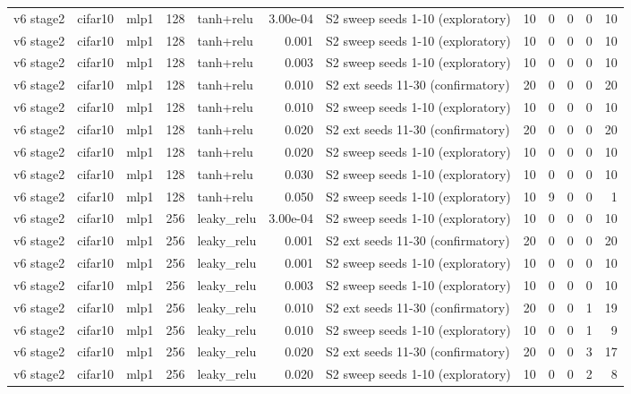 \begin{table}[htbp]
{\begin{tabular}{@{}lllrlrlrrrrr@{}}
v6 stage2 & cifar10 & mlp1 & 128 & tanh+relu & 3.00e-04 & S2 sweep seeds 1-10 (exploratory) & 10 & 0 & 0 & 0 & 10 \\
v6 stage2 & cifar10 & mlp1 & 128 & tanh+relu & 0.001 & S2 sweep seeds 1-10 (exploratory) & 10 & 0 & 0 & 0 & 10 \\
v6 stage2 & cifar10 & mlp1 & 128 & tanh+relu & 0.003 & S2 sweep seeds 1-10 (exploratory) & 10 & 0 & 0 & 0 & 10 \\
v6 stage2 & cifar10 & mlp1 & 128 & tanh+relu & 0.010 & S2 ext seeds 11-30 (confirmatory) & 20 & 0 & 0 & 0 & 20 \\
v6 stage2 & cifar10 & mlp1 & 128 & tanh+relu & 0.010 & S2 sweep seeds 1-10 (exploratory) & 10 & 0 & 0 & 0 & 10 \\
v6 stage2 & cifar10 & mlp1 & 128 & tanh+relu & 0.020 & S2 ext seeds 11-30 (confirmatory) & 20 & 0 & 0 & 0 & 20 \\
v6 stage2 & cifar10 & mlp1 & 128 & tanh+relu & 0.020 & S2 sweep seeds 1-10 (exploratory) & 10 & 0 & 0 & 0 & 10 \\
v6 stage2 & cifar10 & mlp1 & 128 & tanh+relu & 0.030 & S2 sweep seeds 1-10 (exploratory) & 10 & 0 & 0 & 0 & 10 \\
v6 stage2 & cifar10 & mlp1 & 128 & tanh+relu & 0.050 & S2 sweep seeds 1-10 (exploratory) & 10 & 9 & 0 & 0 & 1 \\
v6 stage2 & cifar10 & mlp1 & 256 & leaky\_relu & 3.00e-04 & S2 sweep seeds 1-10 (exploratory) & 10 & 0 & 0 & 0 & 10 \\
v6 stage2 & cifar10 & mlp1 & 256 & leaky\_relu & 0.001 & S2 ext seeds 11-30 (confirmatory) & 20 & 0 & 0 & 0 & 20 \\
v6 stage2 & cifar10 & mlp1 & 256 & leaky\_relu & 0.001 & S2 sweep seeds 1-10 (exploratory) & 10 & 0 & 0 & 0 & 10 \\
v6 stage2 & cifar10 & mlp1 & 256 & leaky\_relu & 0.003 & S2 sweep seeds 1-10 (exploratory) & 10 & 0 & 0 & 0 & 10 \\
v6 stage2 & cifar10 & mlp1 & 256 & leaky\_relu & 0.010 & S2 ext seeds 11-30 (confirmatory) & 20 & 0 & 0 & 1 & 19 \\
v6 stage2 & cifar10 & mlp1 & 256 & leaky\_relu & 0.010 & S2 sweep seeds 1-10 (exploratory) & 10 & 0 & 0 & 1 & 9 \\
v6 stage2 & cifar10 & mlp1 & 256 & leaky\_relu & 0.020 & S2 ext seeds 11-30 (confirmatory) & 20 & 0 & 0 & 3 & 17 \\
v6 stage2 & cifar10 & mlp1 & 256 & leaky\_relu & 0.020 & S2 sweep seeds 1-10 (exploratory) & 10 & 0 & 0 & 2 & 8 \\

\end{tabular}}
\end{table}
